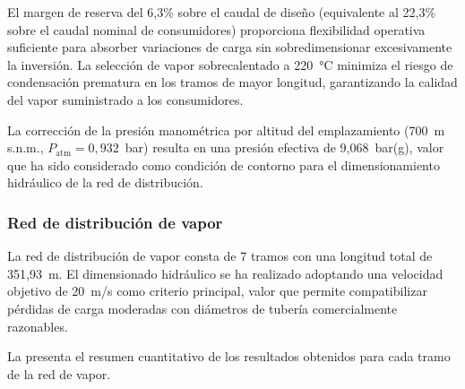El margen de reserva del 6,3\% sobre el caudal de diseño (equivalente al 22,3\% sobre el caudal nominal de consumidores) proporciona flexibilidad operativa suficiente para absorber variaciones de carga sin sobredimensionar excesivamente la inversión. La selección de vapor sobrecalentado a 220~°C minimiza el riesgo de condensación prematura en los tramos de mayor longitud, garantizando la calidad del vapor suministrado a los consumidores.

La corrección de la presión manométrica por altitud del emplazamiento (700~m s.n.m., $P_{\text{atm}} = 0{,}932$~bar) resulta en una presión efectiva de 9,068~bar(g), valor que ha sido considerado como condición de contorno para el dimensionamiento hidráulico de la red de distribución.

\subsubsection{Red de distribución de vapor}
\label{subsubsec:conclusiones-red-vapor}

La red de distribución de vapor consta de 7 tramos con una longitud total de 351,93~m. El dimensionado hidráulico se ha realizado adoptando una velocidad objetivo de 20~m/s como criterio principal, valor que permite compatibilizar pérdidas de carga moderadas con diámetros de tubería comercialmente razonables.

La  presenta el resumen cuantitativo de los resultados obtenidos para cada tramo de la red de vapor.

